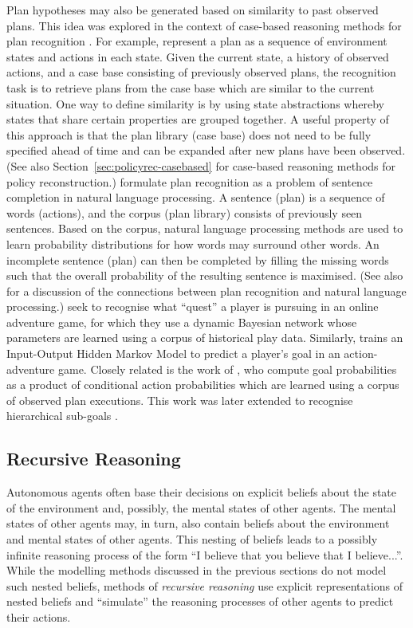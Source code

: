 \documentclass[final,1p,times,authoryear]{elsarticle}
\begin{document}
Plan hypotheses may also be generated based on similarity to past observed plans. This idea was explored in the context of case-based reasoning methods for plan recognition \citep{kc2003,fc2003,bcdk1994}. For example, \citet{kc2003} represent a plan as a sequence of environment states and actions in each state. Given the current state, a history of observed actions, and a case base consisting of previously observed plans, the recognition task is to retrieve plans from the case base which are similar to the current situation. One way to define similarity is by using state abstractions whereby states that share certain properties are grouped together. A useful property of this approach is that the plan library (case base) does not need to be fully specified ahead of time and can be expanded after new plans have been observed. (See also Section~\ref{sec:policyrec-casebased} for case-based reasoning methods for policy reconstruction.) \citet{tzk2016} formulate plan recognition as a problem of sentence completion in natural language processing. A sentence (plan) is a sequence of words (actions), and the corpus (plan library) consists of previously seen sentences. Based on the corpus, natural language processing methods are used to learn probability distributions for how words may surround other words. An incomplete sentence (plan) can then be completed by filling the missing words such that the overall probability of the resulting sentence is maximised. (See also \citet{gs2007} for a discussion of the connections between plan recognition and natural language processing.) \citet{azn1998,aznb1997} seek to recognise what ``quest'' a player is pursuing in an online adventure game, for which they use a dynamic Bayesian network \citep{dk1989} whose parameters are learned using a corpus of historical play data. Similarly, \citet{g2010} trains an Input-Output Hidden Markov Model \citep{bf1995} to predict a player's goal in an action-adventure game. Closely related is the work of \citet{ba2004,ba2003}, who compute goal probabilities as a product of conditional action probabilities which are learned using a corpus of observed plan executions. This work was later extended to recognise hierarchical sub-goals \citep{ba2006}.


		\subsection{\bf Recursive Reasoning} \label{sec:recreas}

Autonomous agents often base their decisions on explicit beliefs about the state of the environment and, possibly, the mental states of other agents. The mental states of other agents may, in turn, also contain beliefs about the environment and mental states of other agents. This nesting of beliefs leads to a possibly infinite reasoning process of the form ``I believe that you believe that I believe...''. While the modelling methods discussed in the previous sections do not model such nested beliefs, methods of \emph{recursive reasoning} use explicit representations of nested beliefs and ``simulate'' the reasoning processes of other agents to predict their actions.
\end{document}
